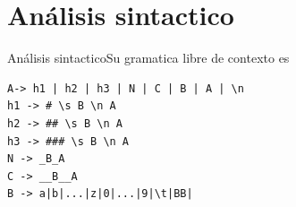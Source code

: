\documentclass[11pt]{beamer}
\begin{document}
\section{Análisis sintactico}

\begin{frame}[fragile]{Análisis sintactico}{Su gramatica libre de contexto es}
\begin{verbatim}
A-> h1 | h2 | h3 | N | C | B | A | \n
h1 -> # \s B \n A
h2 -> ## \s B \n A
h3 -> ### \s B \n A
N -> _B_A
C -> __B__A
B -> a|b|...|z|0|...|9|\t|BB|
\end{verbatim}
\end{frame}
\end{document}
